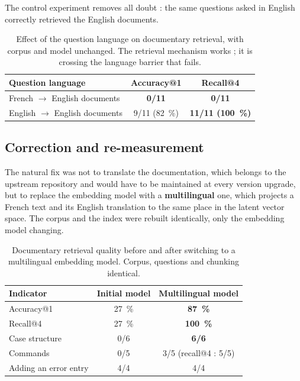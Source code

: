 \documentclass[12pt,a4paper]{report}
\begin{document}
The control experiment removes all doubt : the same questions asked in English
correctly retrieved the English documents.

\begin{table}[htbp]
\centering
\caption[Effect of language on retrieval]{Effect of the question language on
documentary retrieval, with corpus and model unchanged. The retrieval mechanism
works ; it is crossing the language barrier that fails.}
\label{tab:rag-langue}
\begin{tabularx}{0.92\textwidth}{@{}Xcc@{}}
\toprule
\textbf{Question language} & \textbf{Accuracy@1} & \textbf{Recall@4}\\
\midrule
French $\rightarrow$ English documents & \textcolor{cAlert}{\textbf{0/11}} &
  \textcolor{cAlert}{\textbf{0/11}}\\
English $\rightarrow$ English documents & 9/11 (\SI{82}{\percent}) &
  \textbf{11/11 (\SI{100}{\percent})}\\
\bottomrule
\end{tabularx}
\end{table}

\subsection{Correction and re-measurement}

The natural fix was not to translate the documentation, which belongs to the
upstream repository and would have to be maintained at every version upgrade,
but to replace the embedding model with a \textbf{multilingual} one, which
projects a French text and its English translation to the same place in the
latent vector space. The corpus and the index were rebuilt identically, only the
embedding model changing.

\begin{table}[htbp]
\centering
\caption[Documentary retrieval quality]{Documentary retrieval quality before and
after switching to a multilingual embedding model. Corpus, questions and
chunking identical.}
\label{tab:rag}
\begin{tabularx}{0.92\textwidth}{@{}Xcc@{}}
\toprule
\textbf{Indicator} & \textbf{Initial model} & \textbf{Multilingual model}\\
\midrule
Accuracy@1 & \SI{27}{\percent} & \textbf{\SI{87}{\percent}}\\
Recall@4 & \SI{27}{\percent} & \textbf{\SI{100}{\percent}}\\
\midrule
Case structure & 0/6 & \textbf{6/6}\\
Commands & 0/5 & 3/5 (recall@4 : 5/5)\\
Adding an error entry & 4/4 & 4/4\\
\bottomrule
\end{tabularx}
\end{table}
\end{document}
